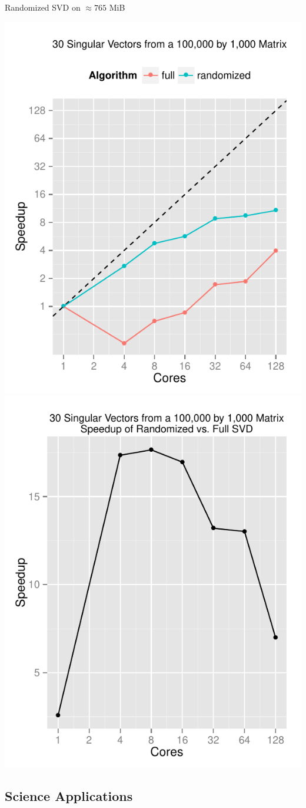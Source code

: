 \begin{frame}
  \begin{block}{Randomized SVD on $\approx 765$ MiB}
    \begin{center}
      \includegraphics[width=.45\textwidth]{../common/pics/randsvd/randSVDspeedup}
      \hfill
      \includegraphics[width=.45\textwidth]{../common/pics/randsvd/randSpeedupSVD}
    \end{center}
  \end{block}
\end{frame}

\subsection{Science Applications}

